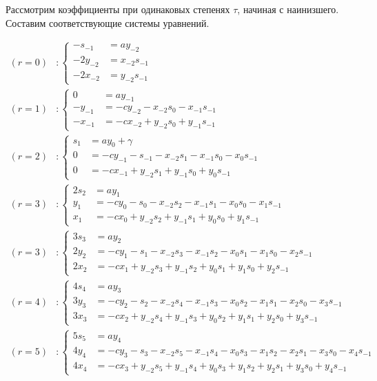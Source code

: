Рассмотрим коэффициенты при одинаковых степенях $ \tau $, начиная с наинизшего. Составим соответствующие системы уравнений.
 
$$
	\begin{aligned}
		(r = 0) &:		
		\left\{
			\begin{aligned}
				-s_{-1} &= ay_{-2} \\
				-2y_{-2} &= x_{-2} s_{-1} \\
				-2x_{-2} &= y_{-2} s_{-1}
			\end{aligned}
		\right.
		\\		
		(r = 1) &:	
		\left\{
			\begin{aligned}
				0 &= ay_{-1} \\
				-y_{-1} &= -cy_{-2} - x_{-2}s_0 - x_{-1}s_{-1}  \\
				-x_{-1} &= -cx_{-2} + y_{-2}s_0 + y_{-1}s_{-1}
			\end{aligned}
		\right.
		\\
		(r = 2) &:	
		\left\{
			\begin{aligned}
				s_1 &= ay_{0} + \gamma \\
				0 &= -cy_{-1} - s_{-1} - x_{-2}s_1 - x_{-1}s_0 - x_0s_{-1}  \\
				0 &= -cx_{-1} + y_{-2}s_1 + y_{-1}s_0 + y_{0}s_{-1}
			\end{aligned}
		\right.
		\\
		(r = 3) &:	
		\left\{
			\begin{aligned}
				2s_2 &= ay_{1} \\
				y_1 &= -cy_{0} - s_0 - x_{-2}s_2 - x_{-1}s_1 - x_0s_0 - x_1s_{-1}  \\
				x_1 &= -cx_{0} + y_{-2}s_2 + y_{-1}s_1 + y_{0}s_0 + y_1s_{-1}
			\end{aligned}
		\right.
		\\
		(r = 3) &:	
		\left\{
			\begin{aligned}
				3s_3 &= ay_{2} \\
				2y_2 &= -cy_{1} - s_1 - x_{-2}s_3 - x_{-1}s_2 - x_0s_1 - x_1s_0 - x_2s_{-1}  \\
				2x_2 &= -cx_{1} + y_{-2}s_3 + y_{-1}s_2 + y_{0}s_1 + y_1s_0 + y_2s_{-1}
			\end{aligned}
		\right.
		\\
		(r = 4) &:	
		\left\{
			\begin{aligned}
				4s_4 &= ay_{3} \\
				3y_3 &= -cy_{2} - s_2 - x_{-2}s_4 - x_{-1}s_3 - x_0s_2 - x_1s_1 - x_2s_0 - x_3s_{-1} \\
				3x_3 &= -cx_{2} + y_{-2}s_4 + y_{-1}s_3 + y_{0}s_2 + y_1s_1 + y_2s_0 + y_3s_{-1}
			\end{aligned}
		\right.
		\\
		(r = 5) &:	
		\left\{
			\begin{aligned}
				5s_5 &= ay_{4} \\
				4y_4 &= -cy_{3} - s_3 - x_{-2}s_5 - x_{-1}s_4 - x_0s_3 - x_1s_2 - x_2s_1 - x_3s_0 - x_4s_{-1} \\
				4x_4 &= -cx_{3} + y_{-2}s_5 + y_{-1}s_4 + y_{0}s_3 + y_1s_2 + y_2s_1 + y_3s_0 + y_4s_{-1}
			\end{aligned}
		\right. 
	\end{aligned}
$$
